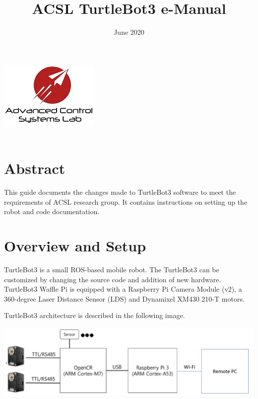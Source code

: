 \documentclass[12]{article}
\title{ACSL TurtleBot3 e-Manual}
\date{June 2020}
\begin{document}
\makeatletter
    \begin{titlepage}
        \begin{center}
            \includegraphics[width=0.7\linewidth]{images/ACSL_Logo.jpg}\\[4ex]
            {\huge \bfseries  \@title }\\[52ex]  
            {\large \@date}
        \end{center}
    \end{titlepage}
\makeatother

\tableofcontents
\newpage

\section*{Abstract}
   
This guide documents the changes made to TurtleBot3 software to meet the requirements of ACSL research group. It contains instructions on setting up the robot and code documentation.
       
\newpage

\section{Overview and Setup}

TurtleBot3 is a small ROS-based mobile robot. The TurtleBot3 can be customized by changing the source code and addition of new hardware. TurtleBot3 Waffle Pi is equipped with a Raspberry Pi Camera Module (v2), a 360-degree Laser Distance Sensor (LDS) and Dynamixel XM430 210-T motors.

TurtleBot3 architecture is described in the following image.\\

\begin{center}
\includegraphics[width=0.7\linewidth]{images/tb3_architecture.png}\\
\end{center}
\end{document}
